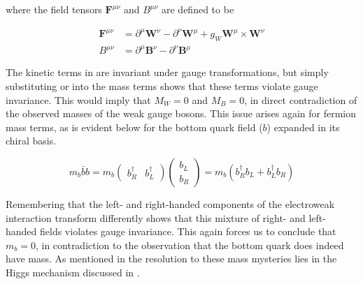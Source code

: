 where the field tensors $\boldsymbol{F}^{\mu\nu}$ and $B^{\mu\nu}$ are defined
to be

\begin{align}
\boldsymbol{F}^{\mu\nu}  &= \partial^{\mu}\boldsymbol{W}^{\nu} -
\partial^{\nu}\boldsymbol{W}^{\mu} + g_{W}\boldsymbol{W}^{\mu} \times
\boldsymbol{W}^{\nu} \\
B^{\mu\nu} &=  \partial^{\mu}\boldsymbol{B}^{\nu} -
\partial^{\nu}\boldsymbol{B}^{\mu}
\end{align}

The kinetic terms in  are invariant under
gauge transformations, but simply substituting  or
 into the mass terms shows that these terms violate gauge
invariance. This would imply that $M_{W} = 0$ and $M_{B} = 0$, in direct
contradiction of the observed masses of the weak gauge bosons.  This issue
arises again for fermion mass terms, as is evident below for the bottom quark field
($b$) expanded in its chiral basis.

\begin{equation}
m_{b}\bar{b}b = m_{b} \left( \begin{matrix}b^{\dagger}_{R} &
b^{\dagger}_{L} \end{matrix} \right) \left( \begin{matrix} b_{L}
\\ b_{R} \end{matrix} \right) = m_{b}(b^{\dagger}_{R}b_{L} +
b^{\dagger}_{L}b_{R})
\end{equation}

Remembering that the left- and right-handed components of the electroweak
interaction transform differently shows that this mixture of right- and left-
handed fields violates gauge invariance. This again forces us to conclude that
$m_{b} = 0$, in contradiction to the observation that the bottom quark does indeed
have mass. As mentioned in  the resolution to these
mass mysteries lies in the Higgs mechanism discussed in .

